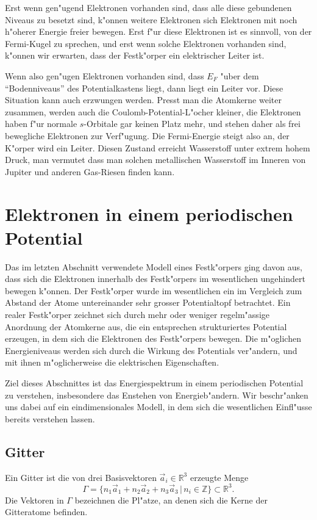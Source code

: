 Erst wenn gen"ugend Elektronen vorhanden sind, dass alle diese gebundenen
Niveaus zu besetzt sind, k"onnen weitere Elektronen sich Elektronen mit
noch h"oherer Energie freier bewegen.
Erst f"ur diese Elektronen ist es sinnvoll, von der Fermi-Kugel zu sprechen,
und erst wenn solche Elektronen vorhanden sind, k"onnen wir erwarten,
dass der Festk"orper ein elektrischer Leiter ist.

Wenn also gen"ugen Elektronen vorhanden sind, dass $E_F$ "uber dem
``Bodenniveaus'' des Potentialkastens liegt, dann liegt ein Leiter vor.
Diese Situation kann auch erzwungen werden.
Presst man die Atomkerne weiter zusammen, werden auch die
Coulomb-Potential-L"ocher kleiner, die Elektronen haben f"ur normale
$s$-Orbitale gar keinen Platz mehr, und stehen daher als frei bewegliche
Elektronen zur Verf"ugung.
Die Fermi-Energie steigt also an, der K"orper wird ein Leiter.
Diesen Zustand erreicht Wasserstoff unter extrem hohem Druck,
man vermutet dass man solchen metallischen Wasserstoff im Inneren
von Jupiter und anderen Gas-Riesen finden kann.

\section{Elektronen in einem periodischen Potential}
Das im letzten Abschnitt verwendete Modell eines Festk"orpers ging davon aus,
dass sich die Elektronen innerhalb des Festk"orpers im wesentlichen
ungehindert bewegen k"onnen.
Der Festk"orper wurde im wesentlichen ein im Vergleich zum Abstand 
der Atome untereinander sehr grosser Potentialtopf betrachtet.
Ein realer Festk"orper zeichnet sich durch mehr oder weniger regelm"assige
Anordnung der Atomkerne aus, die ein entsprechen strukturiertes Potential
erzeugen, in dem sich die Elektronen des Festk"orpers bewegen.
Die m"oglichen Energieniveaus werden sich durch die Wirkung des Potentials
ver"andern, und mit ihnen m"oglicherweise die elektrischen Eigenschaften.

Ziel dieses Abschnittes ist das Energiespektrum in einem periodischen
Potential zu verstehen, insbesondere das Enstehen von Energieb"andern.
Wir beschr"anken uns dabei auf ein eindimensionales Modell, in dem sich die
wesentlichen Einfl"usse bereits verstehen lassen.

\subsection{Gitter}
Ein Gitter ist die von drei Basisvektoren $\vec a_i\in\mathbb R^3$
erzeugte Menge
\[
\Gamma
=
\{
n_1\vec a_1+
n_2\vec a_2+
n_3\vec a_3
\,|\,
n_i\in \mathbb Z
\}\subset{\mathbb R}^3.
\]
Die Vektoren in $\Gamma$ bezeichnen die Pl"atze, an denen sich die
Kerne der Gitteratome befinden. 

